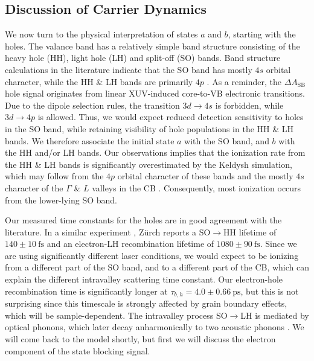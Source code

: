 \subsection{Discussion of Carrier Dynamics}
\label{sec:carrier_dyn_discussion}

We now turn to the physical interpretation of states $a$ and $b$, starting with the holes. The valance band has a relatively simple band structure consisting of the heavy hole (HH), light hole (LH) and split-off (SO) bands. Band structure calculations in the literature indicate that the SO band has mostly $4s$ orbital character, while the HH \& LH bands are primarily $4p$ \cite{zurchDirectSimultaneousObservation2017}. As a reminder, the $\Delta A_{\textrm{SB}}$ hole signal originates from linear XUV-induced core-to-VB electronic transitions. Due to the dipole selection rules, the transition $3d \rightarrow 4s$ is forbidden, while $3d \rightarrow 4p$ is allowed. Thus, we would expect reduced detection sensitivity to holes in the SO band, while retaining visibility of hole populations in the HH \& LH bands. We therefore associate the initial state $a$ with the SO band, and $b$ with the HH and/or LH bands. Our observations implies that the ionization rate from the HH \& LH bands is significantly overestimated by the Keldysh simulation, which may follow from the $4p$ orbital character of these bands and the mostly $4s$ character of the $\Gamma$ \& $L$ valleys in the CB \cite{kaplanFemtosecondTrackingCarrier2018}. Consequently, most ionization occurs from the lower-lying SO band.

Our measured time constants for the holes are in good agreement with the literature. In a similar experiment \cite{zurchDirectSimultaneousObservation2017}, Z\"{u}rch reports a SO$\rightarrow$HH lifetime of $140 \pm 10 \ \textrm{fs}$ and an electron-LH recombination lifetime of $1080 \pm 90 \ \textrm{fs}$. Since we are using significantly different laser conditions, we would expect to be ionizing from a different part of the SO band, and to a different part of the CB, which can explain the different intravalley scattering time constant. Our electron-hole recombination time is significantly longer at $\tau_{b,h} = 4.0 \pm 0.66 \ \textrm{ps}$, but this is not surprising since this timescale is strongly affected by grain boundary effects, which will be sample-dependent. The intravalley process SO$\rightarrow$LH is mediated by optical phonons, which later decay anharmonically to two acoustic phonons \cite{kaplanFemtosecondTrackingCarrier2018}. We will come back to the model shortly, but first we will discuss the electron component of the state blocking signal.


